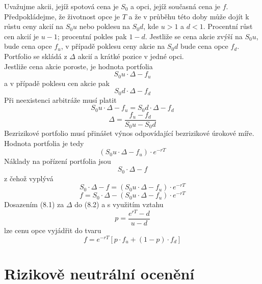 \documentclass[a4paper]{book}
\begin{document}
Uvažujme akcii, jejíž spotová cena je $S_0$ a opci, jejíž současná cena je $f$. Předpokládejme, že životnost opce je $T$ a že v průběhu této doby může dojít k růstu ceny akcií na $S_0u$ nebo poklesu na $S_0d$, kde $u > 1$ a $d < 1$. Procentní růst cen akcií je $u-1$; procentní pokles pak $1-d$. Jestliže se cena akcie zvýší na $S_0u$, bude cena opce $f_u$, v případě poklesu ceny akcie na $S_0d$ bude cena opce $f_d$. Portfolio se skládá z $\Delta$ akcií a krátké pozice v jedné opci.\\
Jestliže cena akcie poroste, je hodnota portfolia
\begin{equation*}
S_0u \cdot \Delta - f_u
\end{equation*}
a v případě poklesu cen akcie pak
\begin{equation*}
S_0d \cdot \Delta - f_d
\end{equation*}
Při neexistenci arbitráže musí platit
\begin{equation*}
S_0u \cdot \Delta - f_u = S_0d \cdot \Delta - f_d
\end{equation*}
\begin{equation}
\Delta = \frac{f_u - f_d}{S_0u - S_0d}
\end{equation}
Bezrizikové portfolio musí přinášet výnos odpovídající bezrizikové úrokové míře. Hodnota portfolia je tedy
\begin{equation*}
(S_0u \cdot \Delta - f_u) \cdot e^{-rT}
\end{equation*}
Náklady na pořízení portfolia jsou
\begin{equation*}
S_0 \cdot \Delta - f
\end{equation*}
z čehož vyplývá
\begin{equation*}
S_0 \cdot \Delta - f = (S_0u \cdot \Delta - f_u) \cdot e^{-rT}
\end{equation*}
\begin{equation}
f = S_0 \cdot \Delta - (S_0u \cdot \Delta - f_u) \cdot e^{-rT}
\end{equation}
Dosazením (8.1) za $\Delta$ do (8.2) a s využitím vztahu
\begin{equation}
p = \frac{e^{rT}-d}{u-d}
\end{equation}
lze cenu opce vyjádřit do tvaru
\begin{equation}
f = e^{-rT}[p \cdot f_u + (1-p) \cdot f_d]
\end{equation}

\section{Rizikově neutrální ocenění}
\end{document}
